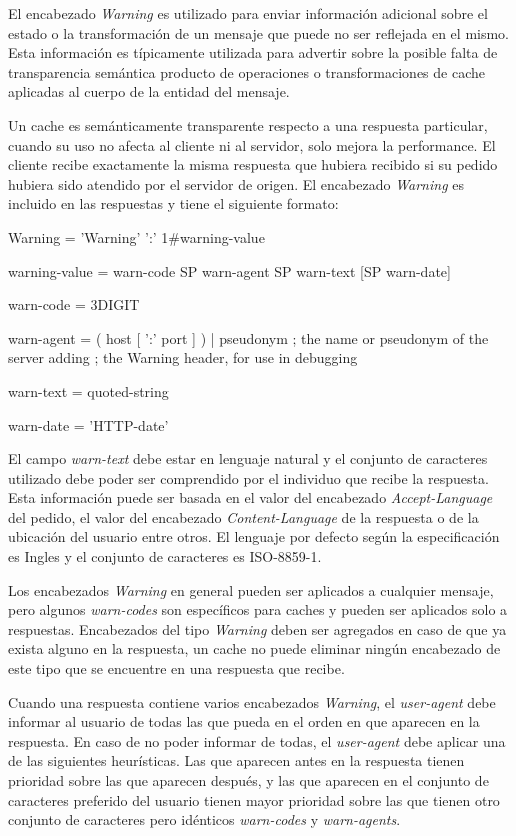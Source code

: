 \documentclass[a4paper,12pt]{report}
\begin{document}
El encabezado \emph{Warning} es utilizado para enviar información adicional sobre el estado o la transformación de un mensaje que puede no ser reflejada en el mismo.
Esta información es típicamente utilizada para advertir sobre la posible falta de transparencia semántica producto de operaciones o transformaciones de cache
aplicadas al cuerpo de la entidad del mensaje.

Un cache es semánticamente transparente respecto a una respuesta particular, cuando su uso no afecta al cliente ni al servidor, solo mejora la performance. El cliente
recibe exactamente la misma respuesta  que hubiera recibido si su pedido hubiera sido atendido por el servidor de origen.
El encabezado \emph{Warning} es incluido en las respuestas y tiene el siguiente formato:


       Warning    = 'Warning' ':' 1\#warning-value

       warning-value = warn-code SP warn-agent SP warn-text
                                             [SP warn-date]

       warn-code  = 3DIGIT

       warn-agent = ( host [ ':' port ] ) | pseudonym
                       ; the name or pseudonym of the server adding
                       ; the Warning header, for use in debugging

       warn-text  = quoted-string

       warn-date  = 'HTTP-date'


El campo \emph{warn-text} debe estar en lenguaje natural y el conjunto de caracteres utilizado debe poder ser comprendido por el individuo que recibe la respuesta. Esta
información puede ser basada en el valor del encabezado \emph{Accept-Language} del pedido, el valor del encabezado \emph{Content-Language} de la respuesta o de la ubicación
del usuario entre otros. El lenguaje por defecto según la especificación es Ingles y el conjunto de caracteres es ISO-8859-1.

Los encabezados \emph{Warning} en general pueden ser aplicados a cualquier mensaje, pero algunos \emph{warn-codes} son específicos para caches y pueden ser aplicados solo
a respuestas. Encabezados del tipo \emph{Warning} deben ser agregados en caso de que ya exista alguno en la respuesta, un cache no puede eliminar ningún encabezado
de este tipo que se encuentre en una respuesta que recibe.

Cuando una respuesta contiene varios encabezados \emph{Warning}, el \emph{user-agent} debe informar al usuario de todas las que pueda en el orden en que aparecen en la
respuesta. En caso de no poder informar de todas, el \emph{user-agent} debe aplicar una de las siguientes heurísticas. Las que aparecen antes en la respuesta tienen prioridad
sobre las que aparecen después, y las que aparecen en el conjunto de caracteres preferido del usuario tienen mayor prioridad sobre las que tienen otro conjunto de caracteres
pero idénticos \emph{warn-codes} y \emph{warn-agents}.
\end{document}
